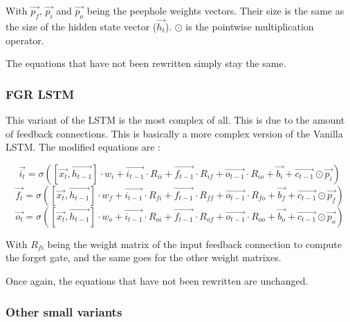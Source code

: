 With $\overrightarrow{p_f}$, $\overrightarrow{p_i}$ and $\overrightarrow{p_o}$ being the peephole weights vectors. Their size is the same as the size of the hidden state vector ($\overrightarrow{h_t}$). $\odot$ is the pointwise multiplication operator.

The equations that have not been rewritten simply stay the same.

\subsubsection{\acf{FGR} \ac{LSTM}}
This variant of the \ac{LSTM} is the most complex of all. This is due to the amount of feedback connections. This is basically a more complex version of the Vanilla \ac{LSTM}. The modified equations are :

\begin{equation}\label{eq:inputGFGR}
  \overrightarrow{i_t}=\sigma ([\overrightarrow{x_{t}},\overrightarrow{h_{t-1}}]\cdot w_i  + \overrightarrow{i_{t-1}}\cdot R_{ii} + \overrightarrow{f_{t-1}}\cdot R_{if} + \overrightarrow{o_{t-1}}\cdot R_{io} + \overrightarrow{b_i} +\overrightarrow{c_{t-1}}\odot \overrightarrow{p_i})
\end{equation}
\begin{equation}\label{eq:forgetGFGR}
  \overrightarrow{f_t}=\sigma ([\overrightarrow{x_{t}},\overrightarrow{h_{t-1}}]\cdot w_f  + \overrightarrow{i_{t-1}}\cdot R_{fi} + \overrightarrow{f_{t-1}}\cdot R_{ff} + \overrightarrow{o_{t-1}}\cdot R_{fo} + \overrightarrow{b_f} +\overrightarrow{c_{t-1}}\odot \overrightarrow{p_f})
\end{equation}
\begin{equation}\label{eq:ouputGFGR}
  \overrightarrow{o_t}=\sigma ([\overrightarrow{x_{t}},\overrightarrow{h_{t-1}}]\cdot w_o + \overrightarrow{i_{t-1}}\cdot R_{oi} + \overrightarrow{f_{t-1}}\cdot R_{of} + \overrightarrow{o_{t-1}}\cdot R_{oo} + \overrightarrow{b_o} +\overrightarrow{c_{t-1}}\odot \overrightarrow{p_o})
\end{equation}

With $R_{fi}$ being the weight matrix of the input feedback connection to compute the forget gate, and the same goes for the other weight matrixes.

Once again, the equations that have not been rewritten are unchanged.

\subsubsection{Other small variants}

